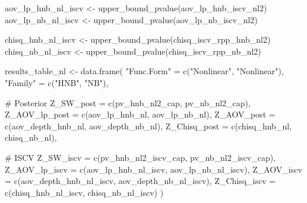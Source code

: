 \documentclass[
  english,
  letterpaper,
  DIV=11,
  numbers=noendperiod]{scrartcl}
\newenvironment{Shaded}{\begin{snugshade}}{\end{snugshade}}
\newcommand{\AttributeTok}[1]{\textcolor[rgb]{0.40,0.45,0.13}{#1}}
\newcommand{\CommentTok}[1]{\textcolor[rgb]{0.37,0.37,0.37}{#1}}
\newcommand{\FunctionTok}[1]{\textcolor[rgb]{0.28,0.35,0.67}{#1}}
\newcommand{\NormalTok}[1]{\textcolor[rgb]{0.00,0.23,0.31}{#1}}
\newcommand{\OtherTok}[1]{\textcolor[rgb]{0.00,0.23,0.31}{#1}}
\newcommand{\StringTok}[1]{\textcolor[rgb]{0.13,0.47,0.30}{#1}}
\begin{document}
\begin{Shaded}
\begin{Highlighting}[]
\NormalTok{aov\_lp\_hnb\_nl\_iscv }\OtherTok{\textless{}{-}} \FunctionTok{upper\_bound\_pvalue}\NormalTok{(aov\_lp\_hnb\_iscv\_nl2)}
\NormalTok{aov\_lp\_nb\_nl\_iscv  }\OtherTok{\textless{}{-}} \FunctionTok{upper\_bound\_pvalue}\NormalTok{(aov\_lp\_nb\_iscv\_nl2)}

\NormalTok{chisq\_hnb\_nl\_iscv }\OtherTok{\textless{}{-}} \FunctionTok{upper\_bound\_pvalue}\NormalTok{(chisq\_iscv\_rpp\_hnb\_nl2)}
\NormalTok{chisq\_nb\_nl\_iscv  }\OtherTok{\textless{}{-}} \FunctionTok{upper\_bound\_pvalue}\NormalTok{(chisq\_iscv\_rpp\_nb\_nl2)}

\NormalTok{results\_table\_nl }\OtherTok{\textless{}{-}} \FunctionTok{data.frame}\NormalTok{(}
  \StringTok{"Func.Form"}      \OtherTok{=} \FunctionTok{c}\NormalTok{(}\StringTok{"Nonlinear"}\NormalTok{, }\StringTok{"Nonlinear"}\NormalTok{),}
  \StringTok{"Family"}         \OtherTok{=} \FunctionTok{c}\NormalTok{(}\StringTok{"HNB"}\NormalTok{, }\StringTok{"NB"}\NormalTok{),}

  \CommentTok{\# Posterior}
  \AttributeTok{Z\_SW\_post        =} \FunctionTok{c}\NormalTok{(pv\_hnb\_nl2\_cap, pv\_nb\_nl2\_cap),}
  \AttributeTok{Z\_AOV\_lp\_post       =} \FunctionTok{c}\NormalTok{(aov\_lp\_hnb\_nl, aov\_lp\_nb\_nl),}
  \AttributeTok{Z\_AOV\_post       =} \FunctionTok{c}\NormalTok{(aov\_depth\_hnb\_nl, aov\_depth\_nb\_nl),}
  \AttributeTok{Z\_Chisq\_post     =} \FunctionTok{c}\NormalTok{(chisq\_hnb\_nl, chisq\_nb\_nl),}

  \CommentTok{\# ISCV}
  \AttributeTok{Z\_SW\_iscv        =} \FunctionTok{c}\NormalTok{(pv\_hnb\_nl2\_iscv\_cap, pv\_nb\_nl2\_iscv\_cap),}
  \AttributeTok{Z\_AOV\_lp\_iscv       =} \FunctionTok{c}\NormalTok{(aov\_lp\_hnb\_nl\_iscv, aov\_lp\_nb\_nl\_iscv),}
  \AttributeTok{Z\_AOV\_iscv       =} \FunctionTok{c}\NormalTok{(aov\_depth\_hnb\_nl\_iscv, aov\_depth\_nb\_nl\_iscv),}
  \AttributeTok{Z\_Chisq\_iscv     =} \FunctionTok{c}\NormalTok{(chisq\_hnb\_nl\_iscv, chisq\_nb\_nl\_iscv)}
\NormalTok{)}


\end{Highlighting}
\end{Shaded}
\end{document}
